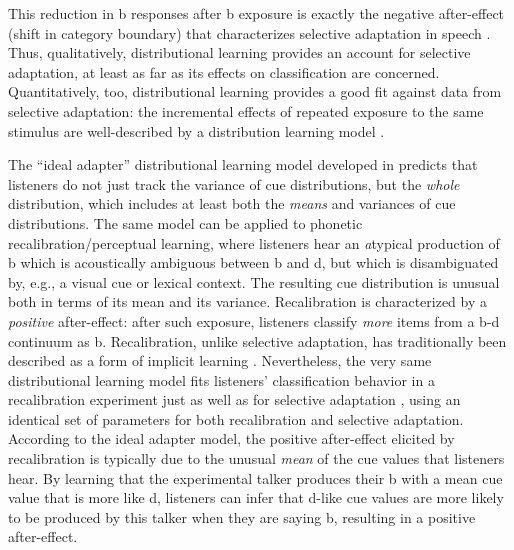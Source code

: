 This reduction in \ph b responses after \ph b exposure is exactly the negative after-effect (shift in category boundary) that characterizes selective adaptation in speech \cite{Eimas1973,Samuel1986}.  Thus, qualitatively, distributional learning provides an account for selective adaptation, at least as far as its effects on classification are concerned.  Quantitatively, too, distributional learning provides a good fit against data from selective adaptation: the incremental effects of repeated exposure to the same stimulus are well-described by a distribution learning model \autocite[$r^2=0.85$, ][]{Kleinschmidt2015}. 

\label{r2-whole-distribution-1}
The ``ideal adapter'' distributional learning model developed in \textcite{Kleinschmidt2015} predicts that listeners do not just track the variance of cue distributions, but the \emph{whole} distribution, which includes at least both the \emph{means} and variances of cue distributions.  The same model can be applied to phonetic recalibration/perceptual learning, where listeners hear an {\em a}typical production of \ph b which is acoustically ambiguous between \ph b and \ph d, but which is disambiguated by, e.g., a visual cue or lexical context.  The resulting cue distribution is unusual both in terms of its mean and its variance.  Recalibration is characterized by a \emph{positive} after-effect: after such exposure, listeners classify \emph{more} items from a \ph b-\ph d continuum as \ph b.  Recalibration, unlike selective adaptation, has traditionally been described as a form of implicit learning \cite{Norris2003,Vroomen2004,Vroomen2007}.  Nevertheless, the very same distributional learning model fits listeners' classification behavior in a recalibration experiment just as well as for selective adaptation \autocite[$r^2 = 0.86$, ][]{Kleinschmidt2015}, using an identical set of parameters for both recalibration and selective adaptation.  According to the ideal adapter model, the positive after-effect elicited by recalibration is typically due to the unusual \emph{mean} of the cue values that listeners hear.  By learning that the experimental talker produces their \ph b with a mean cue value that is more like \ph d, listeners can infer that \ph d-like cue values are more likely to be produced by this talker when they are saying \ph b, resulting in a positive after-effect.


